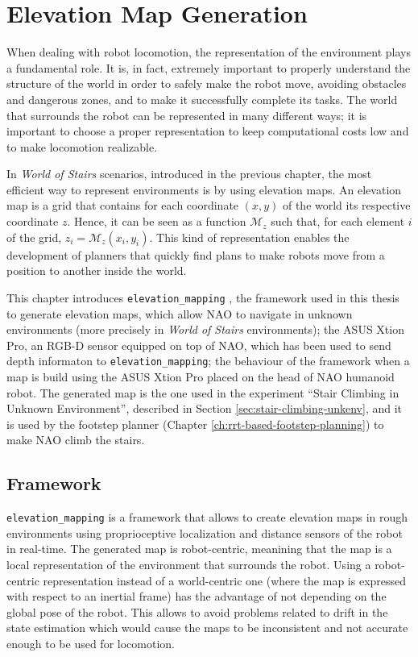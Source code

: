 \chapter{Elevation Map Generation}
\label{ch:elevation-map-generation}
When dealing with robot locomotion, the representation of the environment plays 
a fundamental role. It is, in fact, extremely important to properly
understand the structure of the world in order to safely make the robot move,
avoiding obstacles and dangerous zones, and to make it successfully complete 
its tasks. The world that surrounds the robot can be represented in many 
different ways; it is important to choose a proper representation to keep 
computational costs low and to make locomotion realizable.

In \textit{World of Stairs} scenarios, introduced in the previous chapter, the 
most efficient way to represent environments is by using elevation maps.
An elevation map is a grid that contains for each coordinate $(x, y)$ of the 
world its respective coordinate $z$. Hence, it can be seen as a function 
$\mathcal{M}_z$ such that, for each element $i$ of the grid,
$z_i = \mathcal{M}_z(x_i, y_i)$. This kind of representation enables the 
development of planners that quickly find plans to make robots move from a
position to another inside the world. 

This chapter introduces \texttt{elevation\_mapping}
\cite{Fankhauser2018ProbabilisticTerrainMapping}, the framework used in this 
thesis to generate elevation maps, which allow NAO to navigate in unknown 
environments (more precisely in \textit{World of Stairs} environments);
the ASUS Xtion Pro, an RGB-D sensor equipped on top of NAO, which has been 
used to send depth informaton to \texttt{elevation\_mapping}; 
the behaviour of the framework when a map is build using the ASUS Xtion Pro
placed on the head 
of NAO humanoid robot. The generated map is the one used in the experiment 
``Stair Climbing in Unknown Environment'', described in Section
\ref{sec:stair-climbing-unkenv}, and it is used by the footstep planner (Chapter
\ref{ch:rrt-based-footstep-planning}) to make NAO climb the stairs.

\section{Framework}
\texttt{elevation\_mapping} \cite{Fankhauser2018ProbabilisticTerrainMapping}
is a framework that allows to create elevation maps 
in rough environments using proprioceptive localization and distance sensors 
of the robot in real-time. The generated map is robot-centric,
meanining that the map is a local representation of the environment that 
surrounds the robot. Using a robot-centric representation instead of a 
world-centric one (where the map is expressed with respect to an inertial 
frame) has the advantage of not depending on the global pose of the robot.
This allows to avoid problems related to drift in the state estimation 
which would cause the maps 
to be inconsistent and not accurate enough to be used for locomotion.

